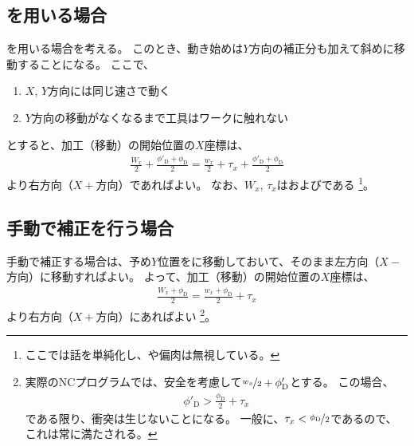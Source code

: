 \subsection{\TDCorrection を用いる場合}
を用いる場合を考える。
このとき、動き始めは$Y$方向の補正分も加えて斜めに移動することになる。
ここで、
\begin{enumerate}[label=\sarrow]
\item $X$, $Y$方向には同じ速さで動く
\item $Y$方向の移動がなくなるまで工具はワークに触れない
\end{enumerate}
とすると、加工（移動）の開始位置の$X$座標は、
\begin{align*}
  \frac{W_x}2+\frac{\phi'_\mathrm D+\phi_\mathrm D}2
  = \frac{w_x}2+\tau_x+\frac{\phi'_\mathrm D+\phi_\mathrm D}2
\end{align*}
より右方向（$X+$方向）であればよい。
なお、$W_x$, $\tau_x$は\ACOD および\ACThickness である
\footnote{ここでは話を単純化し、\PlatingThk や偏肉は無視している。}。


\clearpage
\subsection{手動で補正を行う場合}
手動で補正する場合は、予め$Y$位置をに移動しておいて、そのまま左方向（$X-$方向）に移動すればよい。
よって、加工（移動）の開始位置の$X$座標は、
\begin{align*}
  \frac{W_x+\phi_\mathrm D}2 = \frac{w_x+\phi_\mathrm D}2+\tau_x
\end{align*}
より右方向（$X+$方向）にあればよい
\footnote{実際のNCプログラムでは、安全を考慮して$\nicefrac{w_x}2+\phi'_\mathrm D$とする。
この場合、
\begin{align*}
  \phi'_\mathrm D > \frac{\phi_\mathrm D}2+\tau_x
\end{align*}
である限り、衝突は生じないことになる。
一般に、$\tau_x < \nicefrac{\phi_\mathrm D}2$であるので、これは常に満たされる。}。
